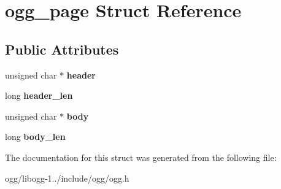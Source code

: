 \hypertarget{structogg__page}{\section{ogg\+\_\+page Struct Reference}
\label{structogg__page}
}
\subsection*{Public Attributes}
\begin{DoxyCompactItemize}
\item 
\hypertarget{structogg__page_acc3e10f279fe5687287c73d36a8892db}{unsigned char $\ast$ {\bfseries header}}\label{structogg__page_acc3e10f279fe5687287c73d36a8892db}

\item 
\hypertarget{structogg__page_aeaa6edc2ff9f2c5cc8f0ecf001936b7b}{long {\bfseries header\+\_\+len}}\label{structogg__page_aeaa6edc2ff9f2c5cc8f0ecf001936b7b}

\item 
\hypertarget{structogg__page_a916ba52eea170500dea6ff3f016e7c94}{unsigned char $\ast$ {\bfseries body}}\label{structogg__page_a916ba52eea170500dea6ff3f016e7c94}

\item 
\hypertarget{structogg__page_ac6e649f0001899b512935448a903abac}{long {\bfseries body\+\_\+len}}\label{structogg__page_ac6e649f0001899b512935448a903abac}

\end{DoxyCompactItemize}


The documentation for this struct was generated from the following file\+:\begin{DoxyCompactItemize}
\item 
ogg/libogg-\/1../include/ogg/ogg.\+h\end{DoxyCompactItemize}
